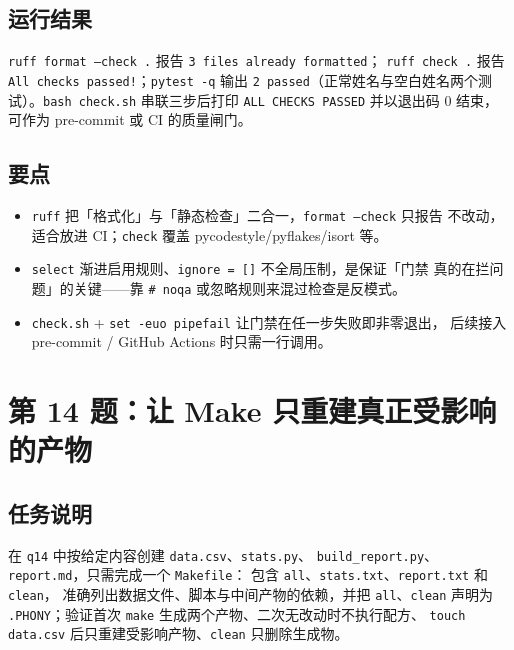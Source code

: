 \documentclass{hamesome-report}
\begin{document}
\subsection{运行结果}
\texttt{ruff\ format\ --check\ .} 报告 \texttt{3 files already formatted}；
\texttt{ruff\ check\ .} 报告 \texttt{All checks passed!}；\texttt{pytest\ -q}
输出 \texttt{2 passed}（正常姓名与空白姓名两个测试）。\texttt{bash\ check.sh}
串联三步后打印 \texttt{ALL CHECKS PASSED} 并以退出码 0 结束，可作为
pre-commit 或 CI 的质量闸门。

\subsection{要点}
\begin{itemize}
\item \texttt{ruff} 把「格式化」与「静态检查」二合一，\texttt{format --check} 只报告
不改动，适合放进 CI；\texttt{check} 覆盖 pycodestyle/pyflakes/isort 等。
\item \texttt{select} 渐进启用规则、\texttt{ignore = []} 不全局压制，是保证「门禁
真的在拦问题」的关键——靠 \texttt{\# noqa} 或忽略规则来混过检查是反模式。
\item \texttt{check.sh} + \texttt{set -euo pipefail} 让门禁在任一步失败即非零退出，
后续接入 pre-commit / GitHub Actions 时只需一行调用。
\end{itemize}

\section{第 14 题：让 Make 只重建真正受影响的产物}
\subsection{任务说明}
在 \texttt{q14} 中按给定内容创建 \texttt{data.csv}、\texttt{stats.py}、
\texttt{build_report.py}、\texttt{report.md}，只需完成一个 \texttt{Makefile}：
包含 \texttt{all}、\texttt{stats.txt}、\texttt{report.txt} 和 \texttt{clean}，
准确列出数据文件、脚本与中间产物的依赖，并把 \texttt{all}、\texttt{clean} 声明为
\texttt{.PHONY}；验证首次 \texttt{make} 生成两个产物、二次无改动时不执行配方、
\texttt{touch data.csv} 后只重建受影响产物、\texttt{clean} 只删除生成物。
\end{document}
